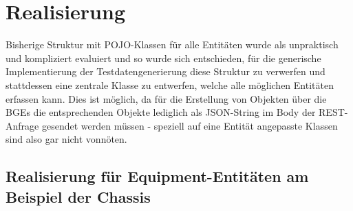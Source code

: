 \chapter{Realisierung}\label{ch:realisierung}

Bisherige Struktur mit POJO-Klassen für alle Entitäten wurde als unpraktisch und kompliziert evaluiert und so wurde sich entschieden, für die generische Implementierung der Testdatengenerierung diese Struktur zu verwerfen und stattdessen eine zentrale Klasse zu entwerfen, welche alle möglichen Entitäten erfassen kann. Dies ist möglich, da für die Erstellung von Objekten über die BGEs die entsprechenden Objekte lediglich als JSON-String im Body der REST-Anfrage gesendet werden müssen - speziell auf eine Entität angepasste Klassen sind also gar nicht vonnöten.

\section{Realisierung für Equipment-Entitäten am Beispiel der Chassis}